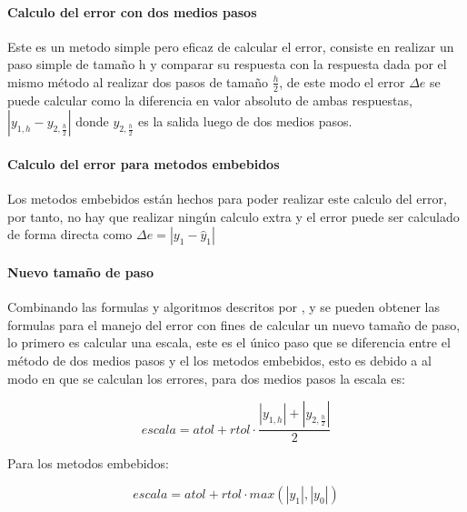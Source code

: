             \paragraph{Calculo del error con dos medios pasos}

                Este es un metodo simple pero eficaz de calcular el error, consiste en realizar un paso simple de tamaño h y comparar su respuesta con la respuesta dada por el mismo método al realizar dos pasos de tamaño $\frac{h}{2}$, de este modo el error $\Delta e$ se puede calcular como la diferencia en valor absoluto de ambas respuestas, $\left|y_{1,h} - y_{2,\frac{h}{2}}\right|$ donde $y_{2,\frac{h}{2}}$ es la salida luego de dos medios pasos.
            
            \paragraph{Calculo del error para metodos embebidos} 

                Los metodos embebidos están hechos para poder realizar este calculo del error, por tanto, no hay que realizar ningún calculo extra y el error puede ser calculado de forma directa como $\Delta e = \left| y_1 - \hat{y}_1\right|$

            \paragraph{Nuevo tamaño de paso}

                Combinando las formulas y algoritmos descritos por \textcite{roganprogramacion}, \textcite{hairer1991solving} y \textcite{ritschel2013numerical} se pueden obtener las formulas para el manejo del error con fines de calcular un nuevo tamaño de paso, lo primero es calcular una escala, este es el único paso que se diferencia entre el método de dos medios pasos y el los metodos embebidos, esto es debido a al modo en que se calculan los errores, para dos medios pasos la escala es:

                \begin{equation}\label{eq:escalaDos}
                    escala = atol + rtol \cdot \frac{\left|y_{1,h}\right| + \left|y_{2,\frac{h}{2}}\right|}{2}
                \end{equation}

                Para los metodos embebidos:

                \begin{equation}\label{eq:escalaEmbebidos}
                    escala = atol + rtol \cdot max(\left| y_1\right|,\left| y_0\right|)
                \end{equation}
        
